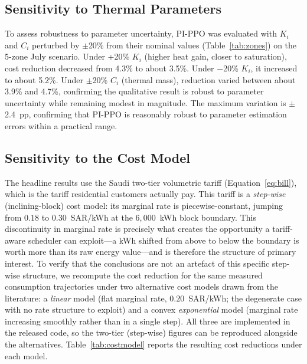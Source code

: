 \documentclass[12pt,a4paper]{article}
\begin{document}
\subsection{Sensitivity to Thermal Parameters}

To assess robustness to parameter uncertainty, PI-PPO was evaluated with $K_i$ and $C_i$ perturbed by $\pm$20\% from their nominal values (Table~\ref{tab:zones}) on the 5-zone July scenario. Under +20\% $K_i$ (higher heat gain, closer to saturation), cost reduction decreased from 4.3\% to about 3.5\%. Under $-$20\% $K_i$, it increased to about 5.2\%. Under $\pm$20\% $C_i$ (thermal mass), reduction varied between about 3.9\% and 4.7\%, confirming the qualitative result is robust to parameter uncertainty while remaining modest in magnitude. The maximum variation is $\pm$2.4~pp, confirming that PI-PPO is reasonably robust to parameter estimation errors within a practical range.

\subsection{Sensitivity to the Cost Model}
\label{sec:costmodel}

The headline results use the Saudi two-tier volumetric tariff (Equation~\eqref{eq:bill}), which is the tariff residential customers actually pay. This tariff is a \emph{step-wise} (inclining-block) cost model: its marginal rate is piecewise-constant, jumping from $0.18$ to $0.30$~SAR/kWh at the $6{,}000$~kWh block boundary. This discontinuity in marginal rate is precisely what creates the opportunity a tariff-aware scheduler can exploit---a kWh shifted from above to below the boundary is worth more than its raw energy value---and is therefore the structure of primary interest. To verify that the conclusions are not an artefact of this specific step-wise structure, we recompute the cost reduction for the same measured consumption trajectories under two alternative cost models drawn from the literature: a \emph{linear} model (flat marginal rate, $0.20$~SAR/kWh; the degenerate case with no rate structure to exploit) and a convex \emph{exponential} model (marginal rate increasing smoothly rather than in a single step). All three are implemented in the released code, so the two-tier (step-wise) figures can be reproduced alongside the alternatives. Table~\ref{tab:costmodel} reports the resulting cost reductions under each model.
\end{document}
